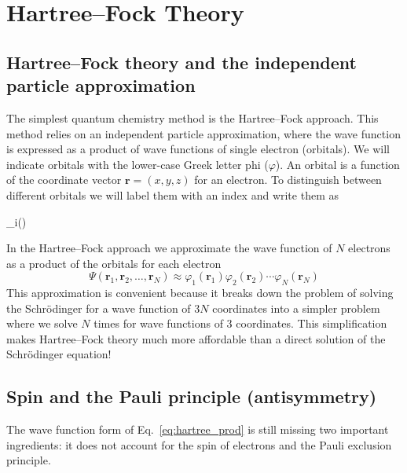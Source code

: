 \documentclass[../Main/chem371-notes.tex]{subfiles}
\begin{document}
\chapter{Hartree--Fock Theory}

\section{Hartree--Fock theory and the independent particle approximation}
The simplest quantum chemistry method is the Hartree--Fock approach.
This method relies on an independent particle approximation, where the wave function is expressed as a product of wave functions of single electron (orbitals).
We will indicate orbitals with the lower-case Greek letter phi ($\varphi$).
An orbital is a function of the coordinate vector $\mathbf{r} = (x,y,z)$ for an electron.
To distinguish between different orbitals we will label them with an index and write them as
\begin{iequation}
\varphi_i()
\end{iequation}

In the Hartree--Fock approach we approximate the wave function of $N$ electrons as a product of the orbitals for each electron
\begin{equation}
\label{eq:hartree_prod}
\Psi(\mathbf{r}_1, \mathbf{r}_2, \ldots, \mathbf{r}_N) \approx \varphi_1(\mathbf{r}_1) \varphi_2(\mathbf{r}_2) \cdots \varphi_N(\mathbf{r}_N)
\end{equation}
This approximation is convenient because it breaks down the problem of solving the Schr\"{o}dinger for a wave function of $3N$ coordinates into a simpler problem where we solve $N$ times for wave functions of 3 coordinates. 
This simplification makes Hartree--Fock theory much more affordable than a direct solution of the Schr\"{o}dinger equation!

\section{Spin and the Pauli principle (antisymmetry)}
The wave function form of Eq.~\eqref{eq:hartree_prod} is still missing two important ingredients: it does not account for the spin of electrons and the Pauli exclusion principle.
\end{document}
